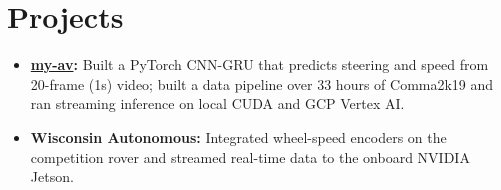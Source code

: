 \documentclass[11pt, letterpaper]{article}
\begin{document}
\section{Projects}
\begin{itemize}
  \item \textbf{\href{https://github.com/lordphone/my-av}{my-av}:} Built a PyTorch CNN-GRU that predicts steering and speed from 20-frame (1s) video; built a data pipeline over 33 hours of Comma2k19 and ran streaming inference on local CUDA and GCP Vertex AI.
  \item \textbf{Wisconsin Autonomous:} Integrated wheel-speed encoders on the competition rover and streamed real-time data to the onboard NVIDIA Jetson.
\end{itemize}
\end{document}
